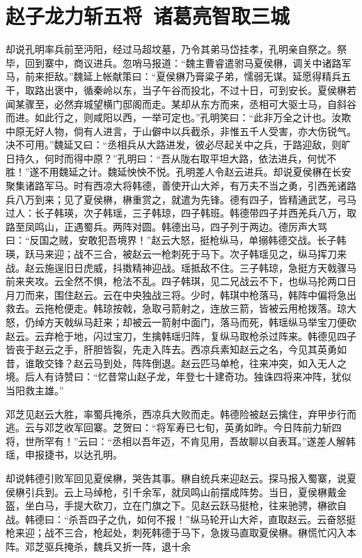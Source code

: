 \chapter{赵子龙力斩五将~诸葛亮智取三城}

却说孔明率兵前至沔阳，经过马超坟墓，乃令其弟马岱挂孝，孔明亲自祭之。祭毕，回到寨中，商议进兵。忽哨马报道：“魏主曹睿遣驸马夏侯楙，调关中诸路军马，前来拒敌。”魏延上帐献策曰：“夏侯楙乃膏粱子弟，懦弱无谋。延愿得精兵五干，取路出褒中，循秦岭以东，当子午谷而投北，不过十日，可到安长。夏侯楙若闻某骤至，必然弃城望横门邸阁而走。某却从东方而来，丞相可大驱士马，自斜谷而进。如此行之，则咸阳以西，一举可定也。”孔明笑曰：“此非万全之计也。汝欺中原无好人物，倘有人进言，于山僻中以兵截杀，非惟五千人受害，亦大伤锐气。决不可用。”魏延又曰：“丞相兵从大路进发，彼必尽起关中之兵，于路迎敌，则旷日持久，何时而得中原？”孔明曰：“吾从陇右取平坦大路，依法进兵，何忧不胜！”遂不用魏延之计。魏延怏怏不悦。孔明差人令赵云进兵。却说夏侯楙在长安聚集诸路军马。时有西凉大将韩德，善使开山大斧，有万夫不当之勇，引西羌诸路兵八万到来；见了夏侯楙，楙重赏之，就遣为先锋。德有四子，皆精通武艺，弓马过人：长子韩瑛，次子韩瑶，三子韩琼，四子韩班。韩德带四子并西羌兵八万，取路至凤鸣山，正遇蜀兵。两阵对圆。韩德出马，四子列于两边。德厉声大骂曰：“反国之贼，安敢犯吾境界！”赵云大怒，挺枪纵马，单搦韩德交战。长子韩瑛，跃马来迎；战不三合，被赵云一枪刺死于马下。次子韩瑶见之，纵马挥刀来战。赵云施逞旧日虎威，抖擞精神迎战。瑶抵敌不住。三子韩琼，急挺方天戟骤马前来夹攻。云全然不惧，枪法不乱。四子韩琪，见二兄战云不下，也纵马抡两口日月刀而来，围住赵云。云在中央独战三将。少时，韩琪中枪落马，韩阵中偏将急出救去。云拖枪便走。韩琼按戟，急取弓箭射之，连放三箭，皆被云用枪拨落。琼大怒，仍绰方天戟纵马赶来；却被云一箭射中面门，落马而死，韩瑶纵马举宝刀便砍赵云。云弃枪于地，闪过宝刀，生擒韩瑶归阵，复纵马取枪杀过阵来。韩德见四子皆丧于赵云之手，肝胆皆裂，先走入阵去。西凉兵素知赵云之名，今见其英勇如昔，谁敢交锋？赵云马到处，阵阵倒退。赵云匹马单枪，往来冲突，如入无人之境。后人有诗赞曰：“忆昔常山赵子龙，年登七十建奇功。独诛四将来冲阵，犹似当阳救主雄。”

邓芝见赵云大胜，率蜀兵掩杀，西凉兵大败而走。韩德险被赵云擒住，弃甲步行而逃。云与邓芝收军回寨。芝贺曰：“将军寿已七旬，英勇如昨。今日阵前力斩四将，世所罕有！”云曰：“丞相以吾年迈，不肯见用，吾故聊以自表耳。”遂差人解韩瑶，申报捷书，以达孔明。

却说韩德引败军回见夏侯楙，哭告其事。楙自统兵来迎赵云。探马报入蜀寨，说夏侯楙引兵到。云上马绰枪，引千余军，就凤鸣山前摆成阵势。当日，夏侯楙戴金盔，坐白马，手提大砍刀，立在门旗之下。见赵云跃马挺枪，往来驰骋，楙欲自战。韩德曰：“杀吾四子之仇，如何不报！”纵马轮开山大斧，直取赵云。云奋怒挺枪来迎；战不三合，枪起处，刺死韩德于马下，急拨马直取夏侯楙。楙慌忙闪入本阵。邓芝驱兵掩杀，魏兵又折一阵，退十余

